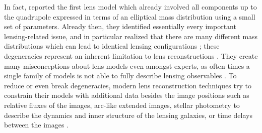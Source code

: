 In fact,  reported the first lens model which already
involved all components up to the quadrupole expressed in terms of an elliptical
mass distribution using a small set of parameters.  Already then, they
identified essentially every important lensing-related issue, and in particular
realized that there are many different mass distributions which can lead to
identical lensing configurations ; these degeneracies
represent an inherent limitation to lens reconstructions .
They create many misconceptions about lens models even amongst experts, as often
times a single family of models is not able to fully describe lensing
observables .  To reduce or even break
degeneracies, modern lens reconstruction techniques try to constrain their
models with additional data besides the image positions such as relative fluxes
of the images, arc-like extended images, stellar photometry to describe the
dynamics and inner structure of the lensing galaxies, or time delays between the
images .
